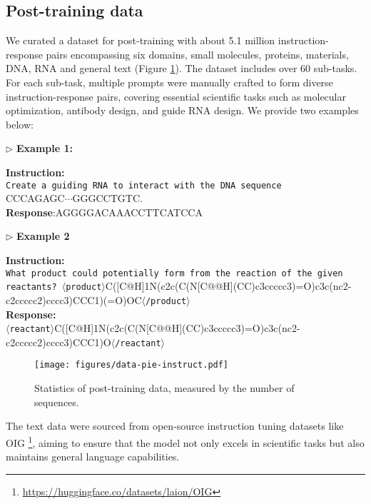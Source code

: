 \subsection{Post-training data}\label{sec:supervised_ft_data}
We curated a dataset for post-training with about 5.1 million instruction-response pairs encompassing six domains, small molecules, proteins, materials, DNA, RNA and general text (Figure \ref{fig:sft_data}). The dataset includes over 60 sub-tasks. For each sub-task, multiple prompts were manually crafted to form diverse instruction-response pairs, covering essential scientific tasks such as molecular optimization, antibody design, and guide RNA design. We provide two examples below:
\begin{example} 
$\rhd$ {\bf Example 1:}

\noindent\textbf{Instruction:}\\ 
\texttt{Create a guiding RNA to interact with the DNA sequence }\\
\noindent\dna{}CCCAGAGC$\cdots$GGGCCTGTC\edna{}.\\   \noindent\textbf{Response}:\rna{}AGGGGACAAACCTTCATCCA\erna{}



\noindent$\rhd$ {\bf Example 2}

\noindent\textbf{Instruction: }\\\texttt{What product could potentially form from the reaction of the given reactants? }$\langle$\texttt{product}$\rangle$C([C@H]1N(c2c(C(N[C@@H](CC)c3ccccc3)=O)c3c(nc2-c2ccccc2)cccc3)CCC1)(=O)OC$\langle$\texttt{/product}$\rangle$\\   
\textbf{Response: }\\$\langle$\texttt{reactant}$\rangle$C([C@H]1N(c2c(C(N[C@@H](CC)c3ccccc3)=O)c3c(nc2-c2ccccc2)cccc3)CCC1)O$\langle$\texttt{/reactant}$\rangle$
    \end{example}  
\begin{figure}[!htbp]
    \centering
    \texttt{[image: figures/data-pie-instruct.pdf]}
    \caption{Statistics of post-training data, measured by the number of sequences.}
    \label{fig:sft_data}
\end{figure}


The text data were sourced from open-source instruction tuning datasets like OIG \footnote{\url{https://huggingface.co/datasets/laion/OIG}}, aiming to ensure that the model not only excels in scientific tasks but also maintains general language capabilities.



